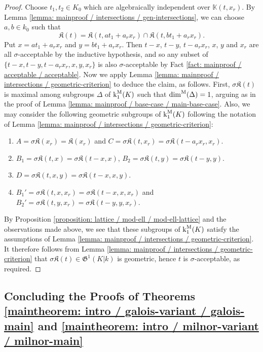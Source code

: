 \documentclass[11pt]{amsart}
\theoremstyle{definition}
\theoremstyle{remark}
\numberwithin{equation}{section}
\newcommand{\Kbb}{\mathbb{K}}
\newcommand{\Kfrak}{\mathfrak{K}}
\newcommand{\Gfrak}{\mathfrak{G}}
\renewcommand{\k}{\operatorname{k}^{\rm M}}
\newcommand{\dimm}{\dim^{\rm M}}
\begin{document}
\begin{proof}
  Choose $t_1,t_2 \in K_0$ which are algebraically independent over $\Kbb(t,x_r)$.
  By Lemma \ref{lemma: mainproof / intersections / gen-intersections}, we can choose $a,b \in k_0$ such that
  \[ \Kfrak(t) = \Kfrak(t,at_1+a_rx_r) \cap \Kfrak(t,bt_1+a_rx_r).\]
  Put $x = a t_1 + a_r x_r$ and $y = b t_1 + a_rx_r$.
  Then $t-x$, $t-y$, $t-a_r x_r$, $x$, $y$ and $x_r$ are all $\sigma$-acceptable by the inductive hypothesis, and so any subset of $\{t-x,t-y,t-a_r x_r,x,y,x_r\}$ is also $\sigma$-acceptable by Fact \ref{fact: mainproof / acceptable / acceptable}.
  Now we apply Lemma \ref{lemma: mainproof / intersections / geometric-criterion} to deduce the claim, as follows.
  First, $\sigma\Kfrak(t)$ is maximal among subgroups $\Delta$ of $\k_1(K)$ such that $\dimm(\Delta) = 1$, arguing as in the proof of Lemma \ref{lemma: mainproof / base-case / main-base-case}.
  Also, we may consider the following geometric subgroups of $\k_1(K)$ following the notation of Lemma \ref{lemma: mainproof / intersections / geometric-criterion}:
  \begin{enumerate}
    \item $A = \sigma \Kfrak(x_r) = \Kfrak(x_r)$ and $C = \sigma\Kfrak(t,x_r) = \sigma \Kfrak(t-a_r x_r,x_r)$.
    \item $B_1 = \sigma\Kfrak(t,x) = \sigma \Kfrak(t-x,x)$, $B_2 = \sigma\Kfrak(t,y) = \sigma \Kfrak(t-y,y)$.
    \item $D = \sigma\Kfrak(t,x,y) = \sigma\Kfrak(t-x,x,y)$.
    \item $B_1' = \sigma\Kfrak(t,x,x_r) = \sigma\Kfrak(t-x,x,x_r)$ and $B_2' = \sigma\Kfrak(t,y,x_r) = \sigma\Kfrak(t-y,y,x_r)$.
  \end{enumerate}
  By Proposition \ref{proposition: lattice / mod-ell / mod-ell-lattice} and the observations made above, we see that these subgroups of $\k_1(K)$ satisfy the assumptions of Lemma \ref{lemma: mainproof / intersections / geometric-criterion}.
  It therefore follows from Lemma \ref{lemma: mainproof / intersections / geometric-criterion} that $\sigma\Kfrak(t) \in \Gfrak^1(K|k)$ is geometric, hence $t$ is $\sigma$-acceptable, as required.
\end{proof}

\subsection{Concluding the Proofs of Theorems \ref{maintheorem: intro / galois-variant / galois-main} and \ref{maintheorem: intro / milnor-variant / milnor-main}}
\label{subsection: mainproof / conclusion}
\end{document}
